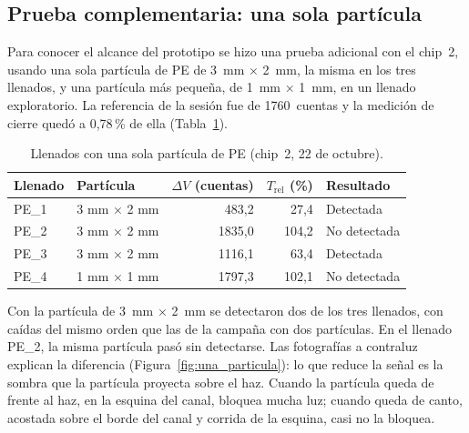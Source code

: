 


\subsection{Prueba complementaria: una sola partícula}

Para conocer el alcance del prototipo se hizo una prueba adicional con el chip~2, usando
una sola partícula de PE de 3~mm $\times$ 2~mm, la misma en los tres llenados, y una
partícula más pequeña, de 1~mm $\times$ 1~mm, en un llenado exploratorio. La referencia de
la sesión fue de 1760~cuentas y la medición de cierre quedó a 0,78\,\% de ella
(Tabla~\ref{tab:una_particula}).

\begin{table}[htbp]
  \centering
  \caption{Llenados con una sola partícula de PE (chip~2, 22 de octubre).}
  \label{tab:una_particula}
  \begin{tabular}{llrrl}
    \hline
    Llenado & Partícula & $\Delta V$ (cuentas) & $T_{\mathrm{rel}}$ (\%) & Resultado \\
    \hline
    PE\_1 & 3 mm $\times$ 2 mm & 483,2  & 27,4  & Detectada \\
    PE\_2 & 3 mm $\times$ 2 mm & 1835,0 & 104,2 & No detectada \\
    PE\_3 & 3 mm $\times$ 2 mm & 1116,1 & 63,4  & Detectada \\
    PE\_4 & 1 mm $\times$ 1 mm & 1797,3 & 102,1 & No detectada \\
    \hline
  \end{tabular}
\end{table}

Con la partícula de 3~mm $\times$ 2~mm se detectaron dos de los tres llenados, con caídas
del mismo orden que las de la campaña con dos partículas. En el llenado PE\_2, la misma
partícula pasó sin detectarse. Las fotografías a contraluz explican la diferencia
(Figura~\ref{fig:una_particula}): lo que reduce la señal es la sombra que la partícula
proyecta sobre el haz. Cuando la partícula queda de frente al haz, en la esquina del
canal, bloquea mucha luz; cuando queda de canto, acostada sobre el borde del canal y
corrida de la esquina, casi no la bloquea.

